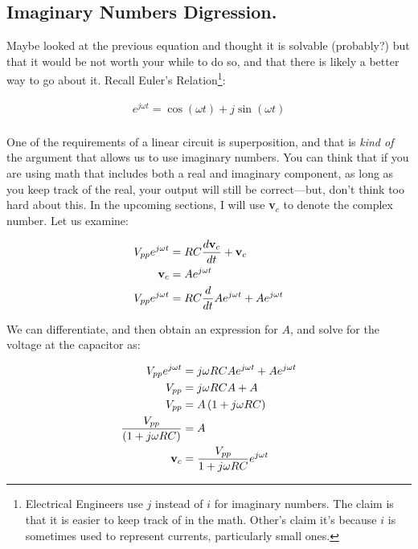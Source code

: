 \subsection{Imaginary Numbers Digression.}
Maybe looked at the previous equation and thought it is solvable (probably?) but that it would be not worth your while to do so, and that there is likely a better way to go about it. Recall Euler's Relation\footnote{Electrical Engineers use $j$ instead of $i$ for imaginary numbers. The claim is that it is easier to keep track of in the math. Other's claim it's because $i$ is sometimes used to represent currents, particularly small ones.}: 

\begin{equation} \label{imag1}
\begin{split}
e^{j\omega t} = \cos(\omega t) + j\sin(\omega t) \\
\end{split}
\end{equation}

One of the requirements of a linear circuit is superposition, and that is \textit{kind of} the argument that allows us to use imaginary numbers. You can think that if you are using math that includes both a real and imaginary component, as long as you keep track of the real, your output will still be correct---but, don't think too hard about this. In the upcoming sections, I will use \textbf{v}$_c$ to denote the complex number. Let us examine: 

\begin{equation} \label{imag2}
\begin{split}
{ V}_{ pp} e^{j\omega t} &= RC\frac{d\textbf{v}_c}{dt} + \textbf{v}_c \\
\textbf{v}_c &= Ae^{j\omega t} \\
{ V}_{ pp} e^{j\omega t} &= RC\frac{d}{dt}Ae^{j\omega t} + Ae^{j\omega t} \\
\end{split}
\end{equation}

We can differentiate, and then obtain an expression for $A$, and solve for the voltage at the capacitor as:

\begin{equation} \label{imag3}
\begin{split}
{ V}_{ pp} e^{j\omega t} &= j\omega RCAe^{j\omega t} + Ae^{j\omega t} \\
{ V}_{ pp} &= j\omega RCA + A \\
{ V}_{ pp} &= A\left(1 + j\omega RC\right)\\
\frac{{ V}_{ pp}}{\left(1 + j\omega RC\right)} &= A\\
\textbf{v}_c &= \frac{{ V}_{ pp}}{1 + j\omega RC}e^{j\omega t} \\
\end{split}
\end{equation}

